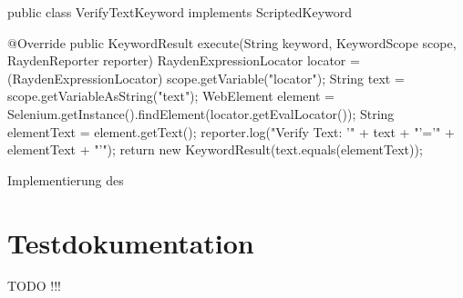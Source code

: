 \begin{program}
\begin{JavaCode}
public class VerifyTextKeyword implements ScriptedKeyword {

  @Override
  public KeywordResult execute(String keyword, KeywordScope scope, RaydenReporter reporter) {
    RaydenExpressionLocator locator = (RaydenExpressionLocator) scope.getVariable("locator");
    String text = scope.getVariableAsString("text");
    WebElement element = Selenium.getInstance().findElement(locator.getEvalLocator());
    String elementText = element.getText();
    reporter.log("Verify Text: '" + text + "'='" + elementText + "'");
    return new KeywordResult(text.equals(elementText));
  }
}
\end{JavaCode}
\caption{Implementierung des }
\label{prog:verifyTextKeyword}
\end{program}

\todo

\clearpage

\section{Testdokumentation}

TODO !!!
